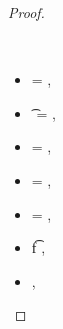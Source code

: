 \begin{lemma}
\begin{proof}
\begin{case}[T-App]
  \ 

  \begin{itemize}
    \item
  \e{} = { {}},
    \item
  \t{} = {
                      {}
                      {\x{}}},
    \item
  {\thenprop {\prop{}}} = 
                 {
                              {}
                              {\x{}}},
    \item
  {\elseprop {\prop{}}} = 
                 {
                              {}
                              {\x{}}},
    \item
  \object{} = {
                           {}
                           {\x{}}},
    \item
  \judgement {\propenv{}} { {\ArrowOne {\x{}} {\s{}}
                                                       {\t{f}}
                                                       {
                                                                   {}}
                                                       {}}}
                {
                            {}}
                {},
    \item
  \judgement {\propenv{}}
                 { {\s{}}}
                 {
                             {}}
                 {},
  \end{itemize}

\end{case}
\end{proof}
\end{lemma}
